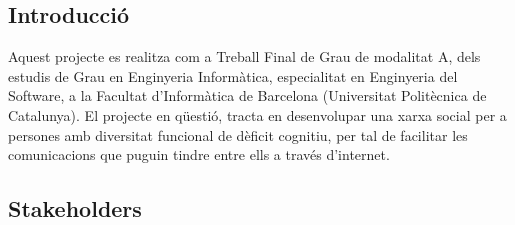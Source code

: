 \documentclass[11pt,catalan,listoffigures,listoftables]{tfgetsinf}
\begin{document}
\subsection{Introducció}

Aquest projecte es realitza com a Treball Final de Grau de modalitat A, dels estudis de Grau en Enginyeria Informàtica, especialitat en Enginyeria del Software, a la Facultat d’Informàtica de Barcelona (Universitat Politècnica de Catalunya).
El projecte en qüestió, tracta en desenvolupar una xarxa social per a persones amb diversitat funcional de dèficit cognitiu, per tal de facilitar les comunicacions que puguin tindre entre ells a través d’internet.

\subsection{Stakeholders}
\end{document}
